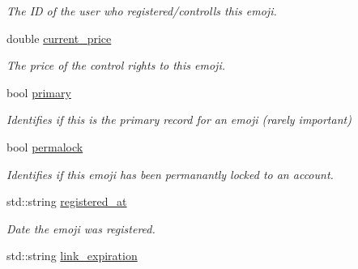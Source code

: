 \begin{DoxyCompactItemize}
\begin{DoxyCompactList}\small\item\em The ID of the user who registered/controlls this emoji. \end{DoxyCompactList}\item 
double \hyperlink{classEmojidex_1_1Data_1_1Emoji_a7828abfde9015bb688be4a93624f9dfe}{current\+\_\+price}\hypertarget{classEmojidex_1_1Data_1_1Emoji_a7828abfde9015bb688be4a93624f9dfe}{}\label{classEmojidex_1_1Data_1_1Emoji_a7828abfde9015bb688be4a93624f9dfe}

\begin{DoxyCompactList}\small\item\em The price of the control rights to this emoji. \end{DoxyCompactList}\item 
bool \hyperlink{classEmojidex_1_1Data_1_1Emoji_afec2932bf98282f36d96c038fcf1ae13}{primary}\hypertarget{classEmojidex_1_1Data_1_1Emoji_afec2932bf98282f36d96c038fcf1ae13}{}\label{classEmojidex_1_1Data_1_1Emoji_afec2932bf98282f36d96c038fcf1ae13}

\begin{DoxyCompactList}\small\item\em Identifies if this is the primary record for an emoji (rarely important) \end{DoxyCompactList}\item 
bool \hyperlink{classEmojidex_1_1Data_1_1Emoji_a74e1049056e4dd3aa8dd4b5c08fcae1e}{permalock}\hypertarget{classEmojidex_1_1Data_1_1Emoji_a74e1049056e4dd3aa8dd4b5c08fcae1e}{}\label{classEmojidex_1_1Data_1_1Emoji_a74e1049056e4dd3aa8dd4b5c08fcae1e}

\begin{DoxyCompactList}\small\item\em Identifies if this emoji has been permanantly locked to an account. \end{DoxyCompactList}\item 
std\+::string \hyperlink{classEmojidex_1_1Data_1_1Emoji_a1bea369e1adc382cd1dc7c5c65cced03}{registered\+\_\+at}\hypertarget{classEmojidex_1_1Data_1_1Emoji_a1bea369e1adc382cd1dc7c5c65cced03}{}\label{classEmojidex_1_1Data_1_1Emoji_a1bea369e1adc382cd1dc7c5c65cced03}

\begin{DoxyCompactList}\small\item\em Date the emoji was registered. \end{DoxyCompactList}\item 
std\+::string \hyperlink{classEmojidex_1_1Data_1_1Emoji_abd597aeadcd7200b1699b61b70b0b183}{link\+\_\+expiration}\hypertarget{classEmojidex_1_1Data_1_1Emoji_abd597aeadcd7200b1699b61b70b0b183}{}\label{classEmojidex_1_1Data_1_1Emoji_abd597aeadcd7200b1699b61b70b0b183}


\end{DoxyCompactItemize}
